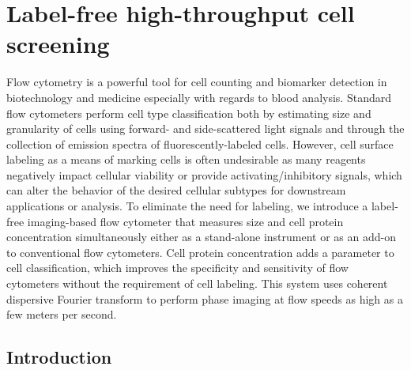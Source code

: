 \chapter{Label-free high-throughput cell screening}
\label{chp:BOE2013_Chapter}

Flow cytometry is a powerful tool for cell counting and biomarker detection in biotechnology and medicine especially with regards to blood analysis. Standard flow cytometers perform cell type classification both by estimating size and granularity of cells using forward- and side-scattered light signals and through the collection of emission spectra of fluorescently-labeled cells. However, cell surface labeling as a means of marking cells is often undesirable as many reagents negatively impact cellular viability or provide activating/inhibitory signals, which can alter the behavior of the desired cellular subtypes for downstream applications or analysis. To eliminate the need for labeling, we introduce a label-free imaging-based flow cytometer that measures size and cell protein concentration simultaneously either as a stand-alone instrument or as an add-on to conventional flow cytometers. Cell protein concentration adds a parameter to cell classification, which improves the specificity and sensitivity of flow cytometers without the requirement of cell labeling. This system uses coherent dispersive Fourier transform to perform phase imaging at flow speeds as high as a few meters per second.

\section{Introduction}

